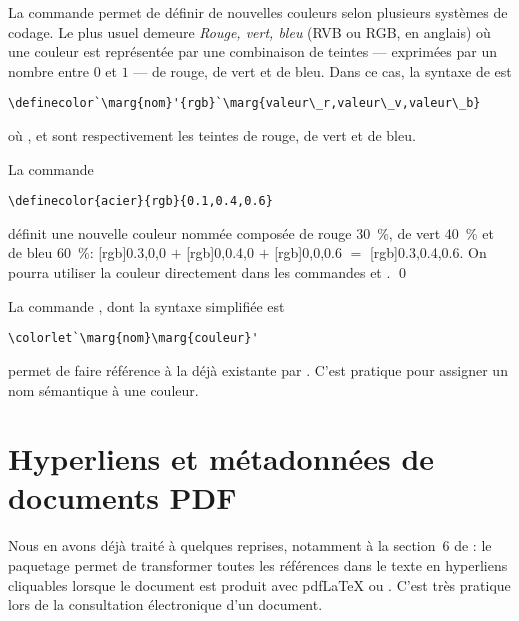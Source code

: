 La commande \cmd{\definecolor} permet de définir de nouvelles couleurs
selon plusieurs systèmes de codage. Le plus usuel demeure \emph{Rouge,
  vert, bleu} (RVB ou RGB, en anglais) où une couleur est représentée
par une combinaison de teintes --- exprimées par un nombre entre $0$
et $1$ --- de rouge, de vert et de bleu. Dans ce cas, la syntaxe de
\cmd{\definecolor} est
\begin{lstlisting}
\definecolor`\marg{nom}'{rgb}`\marg{valeur\_r,valeur\_v,valeur\_b}
\end{lstlisting}
où ,  et  sont
respectivement les teintes de rouge, de vert et de bleu.

\begin{exemple}
  La commande
\begin{lstlisting}
\definecolor{acier}{rgb}{0.1,0.4,0.6}
\end{lstlisting}
  définit une nouvelle couleur nommée  composée de rouge
  30~\%, de vert 40~\% et de bleu 60~\%: %
  [rgb]{0.3,0,0}{\phantom{xx}} $+$ %
  [rgb]{0,0.4,0}{\phantom{xx}} $+$ %
  [rgb]{0,0,0.6}{\phantom{xx}} $=$ %
  [rgb]{0.3,0.4,0.6}{\phantom{xx}}. %
  On pourra utiliser la couleur  directement dans les
  commandes \cmdprint{\color} et \cmdprint{\textcolor}. %
  \qed
\end{exemple}

La commande , dont la syntaxe simplifiée est
\begin{lstlisting}
\colorlet`\marg{nom}\marg{couleur}'
\end{lstlisting}
permet de faire référence à la  déjà existante par
. C'est pratique pour assigner un nom sémantique à une
couleur.



\section{Hyperliens et métadonnées de documents PDF}
\label{sec:trucs:hyperliens}

Nous en avons déjà traité à quelques reprises, notamment à la
section~6 de \citet{UL:latex:1}: le paquetage 
\citep{hyperref} permet de transformer toutes les références dans le
texte en hyperliens cliquables lorsque le document est produit avec
pdf{\LaTeX} ou {\XeLaTeX}. C'est très pratique lors de la consultation
électronique d'un document.


